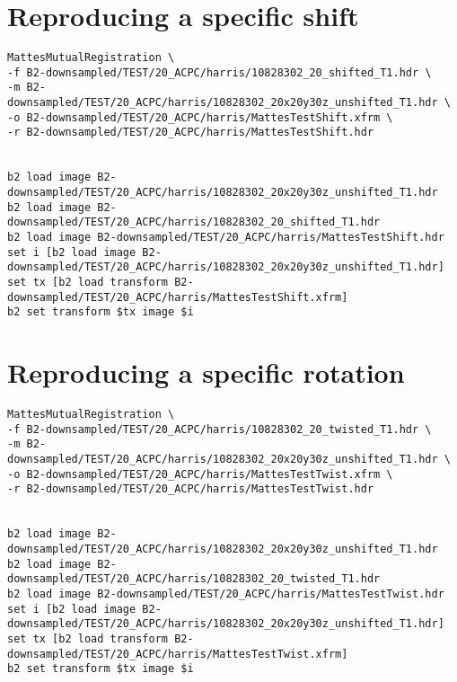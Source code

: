 \documentclass [10pt,twocolumn,twoside,final,letterpaper]{report}
\begin{document}
\section{Reproducing a specific shift}
\begin{verbatim}
MattesMutualRegistration \
-f B2-downsampled/TEST/20_ACPC/harris/10828302_20_shifted_T1.hdr \
-m B2-downsampled/TEST/20_ACPC/harris/10828302_20x20y30z_unshifted_T1.hdr \
-o B2-downsampled/TEST/20_ACPC/harris/MattesTestShift.xfrm \
-r B2-downsampled/TEST/20_ACPC/harris/MattesTestShift.hdr


b2 load image B2-downsampled/TEST/20_ACPC/harris/10828302_20x20y30z_unshifted_T1.hdr
b2 load image B2-downsampled/TEST/20_ACPC/harris/10828302_20_shifted_T1.hdr
b2 load image B2-downsampled/TEST/20_ACPC/harris/MattesTestShift.hdr
set i [b2 load image B2-downsampled/TEST/20_ACPC/harris/10828302_20x20y30z_unshifted_T1.hdr]
set tx [b2 load transform B2-downsampled/TEST/20_ACPC/harris/MattesTestShift.xfrm]
b2 set transform $tx image $i
\end{verbatim}

\section{Reproducing a specific rotation}
\begin{verbatim}
MattesMutualRegistration \
-f B2-downsampled/TEST/20_ACPC/harris/10828302_20_twisted_T1.hdr \
-m B2-downsampled/TEST/20_ACPC/harris/10828302_20x20y30z_unshifted_T1.hdr \
-o B2-downsampled/TEST/20_ACPC/harris/MattesTestTwist.xfrm \
-r B2-downsampled/TEST/20_ACPC/harris/MattesTestTwist.hdr


b2 load image B2-downsampled/TEST/20_ACPC/harris/10828302_20x20y30z_unshifted_T1.hdr
b2 load image B2-downsampled/TEST/20_ACPC/harris/10828302_20_twisted_T1.hdr
b2 load image B2-downsampled/TEST/20_ACPC/harris/MattesTestTwist.hdr
set i [b2 load image B2-downsampled/TEST/20_ACPC/harris/10828302_20x20y30z_unshifted_T1.hdr]
set tx [b2 load transform B2-downsampled/TEST/20_ACPC/harris/MattesTestTwist.xfrm]
b2 set transform $tx image $i
\end{verbatim}
\end{document}
